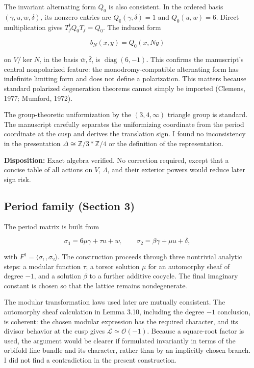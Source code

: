 \documentclass[
  10pt,
  letterpaper,
]{article}
\newcommand{\Z}{\mathbb Z}
\newcommand{\cO}{\mathcal O}
\begin{document}
The invariant alternating form \(Q_0\) is also consistent. In the
ordered basis \((\gamma,u,w,\delta)\), its nonzero entries are
\(Q_0(\gamma,\delta)=1\) and \(Q_0(u,w)=6\). Direct multiplication gives
\(T_j^tQ_0T_j=Q_0\). The induced form

\[
b_N(x,y)=Q_0(x,Ny)
\]

on \(V/\ker N\), in the basis \(\bar w,\bar\delta\), is
\(\operatorname{diag}(6,-1)\). This confirms the manuscript's central
nonpolarized feature: the monodromy-compatible alternating form has
indefinite limiting form and does not define a polarization. This
matters because standard polarized degeneration theorems cannot simply
be imported (Clemens, 1977; Mumford, 1972).

The group-theoretic uniformization by the \((3,4,\infty)\) triangle
group is standard. The manuscript carefully separates the uniformizing
coordinate from the period coordinate at the cusp and derives the
translation sign. I found no inconsistency in the presentation
\(\Delta\cong\Z/3*\Z/4\) or the definition of the representation.

\textbf{Disposition:} Exact algebra verified. No correction required,
except that a concise table of all actions on \(V\), \(\Lambda\), and
their exterior powers would reduce later sign risk.

\subsection{Period family (Section 3)}\label{period-family-section-3}

The period matrix is built from

\[
\sigma_1=6\mu\gamma+\tau u+w,
\qquad
\sigma_2=\beta\gamma+\mu u+\delta,
\]

with \(F^1=\langle\sigma_1,\sigma_2\rangle\). The construction proceeds
through three nontrivial analytic steps: a modular function \(\tau\), a
torsor solution \(\mu\) for an automorphy sheaf of degree \(-1\), and a
solution \(\beta\) to a further additive cocycle. The final imaginary
constant is chosen so that the lattice remains nondegenerate.

The modular transformation laws used later are mutually consistent. The
automorphy sheaf calculation in Lemma 3.10, including the degree \(-1\)
conclusion, is coherent: the chosen modular expression has the required
character, and its divisor behavior at the cusp gives
\(\mathcal L\simeq\cO(-1)\). Because a square-root factor is used, the
argument would be clearer if formulated invariantly in terms of the
orbifold line bundle and its character, rather than by an implicitly
chosen branch. I did not find a contradiction in the present
construction.
\end{document}
